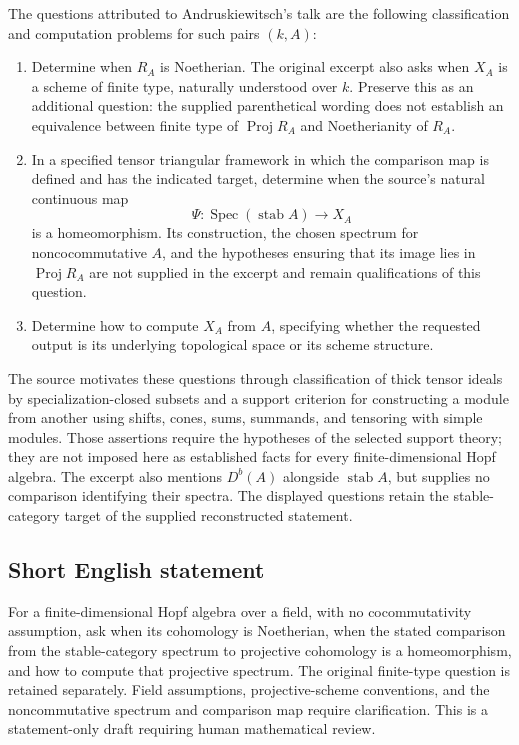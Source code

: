 \documentclass[11pt]{article}
\begin{document}
The questions attributed to Andruskiewitsch's talk are the following classification and computation problems for such pairs \((k,A)\):
\begin{enumerate}
\item Determine when \(R_A\) is Noetherian. The original excerpt also asks when \(X_A\) is a scheme of finite type, naturally understood over \(k\). Preserve this as an additional question: the supplied parenthetical wording does not establish an equivalence between finite type of \(\operatorname{Proj}R_A\) and Noetherianity of \(R_A\).
\item In a specified tensor triangular framework in which the comparison map is defined and has the indicated target, determine when the source's natural continuous map
\[
\Psi:\operatorname{Spec}(\operatorname{stab}A)\longrightarrow X_A
\]
is a homeomorphism. Its construction, the chosen spectrum for noncocommutative \(A\), and the hypotheses ensuring that its image lies in \(\operatorname{Proj}R_A\) are not supplied in the excerpt and remain qualifications of this question.
\item Determine how to compute \(X_A\) from \(A\), specifying whether the requested output is its underlying topological space or its scheme structure.
\end{enumerate}
The source motivates these questions through classification of thick tensor ideals by specialization-closed subsets and a support criterion for constructing a module from another using shifts, cones, sums, summands, and tensoring with simple modules. Those assertions require the hypotheses of the selected support theory; they are not imposed here as established facts for every finite-dimensional Hopf algebra. The excerpt also mentions \(D^b(A)\) alongside \(\operatorname{stab}A\), but supplies no comparison identifying their spectra. The displayed questions retain the stable-category target of the supplied reconstructed statement.
\subsection{Short English statement}
For a finite-dimensional Hopf algebra over a field, with no cocommutativity assumption, ask when its cohomology is Noetherian, when the stated comparison from the stable-category spectrum to projective cohomology is a homeomorphism, and how to compute that projective spectrum. The original finite-type question is retained separately. Field assumptions, projective-scheme conventions, and the noncommutative spectrum and comparison map require clarification. This is a statement-only draft requiring human mathematical review.
\end{document}
